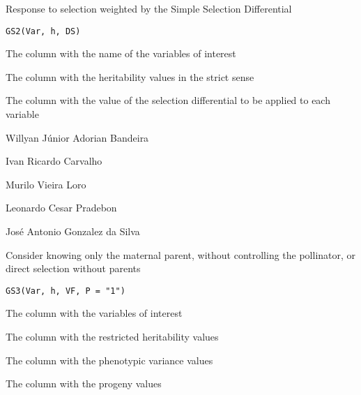 \documentclass[a4paper]{book}
\begin{document}
%
\begin{Description}
Response to selection weighted by the Simple Selection Differential
\end{Description}
%
\begin{Usage}
\begin{verbatim}
GS2(Var, h, DS)
\end{verbatim}
\end{Usage}
%
\begin{Arguments}
\begin{ldescription}
\item[\code{Var}] The column with the name of the variables of interest

\item[\code{h}] The column with the heritability values in the strict sense

\item[\code{DS}] The column with the value of the selection differential to be applied
to each variable
\end{ldescription}
\end{Arguments}
%
\begin{Author}
Willyan Júnior Adorian Bandeira

Ivan Ricardo Carvalho

Murilo Vieira Loro

Leonardo Cesar Pradebon

José Antonio Gonzalez da Silva
\end{Author}
%
\begin{Description}
Consider knowing only the maternal parent, without controlling the pollinator,
or direct selection without parents
\end{Description}
%
\begin{Usage}
\begin{verbatim}
GS3(Var, h, VF, P = "1")
\end{verbatim}
\end{Usage}
%
\begin{Arguments}
\begin{ldescription}
\item[\code{Var}] The column with the variables of interest

\item[\code{h}] The column with the restricted heritability values

\item[\code{VF}] The column with the phenotypic variance values

\item[\code{P}] The column with the progeny values
\end{ldescription}
\end{Arguments}
\end{document}

